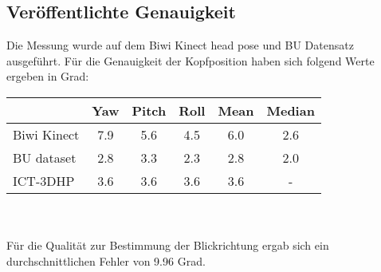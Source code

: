 \subsection{Veröffentlichte Genauigkeit}
Die Messung wurde auf dem Biwi Kinect head pose und BU Datensatz ausgeführt. Für die Genauigkeit der Kopfposition haben sich folgend Werte ergeben in Grad:\\
\begin{tabular}{|l|c|c|c||c|c|}
	\hline
	&Yaw&Pitch&Roll&Mean&Median\\\hline
	Biwi Kinect \cite{BIWI_database}&7.9&5.6&4.5&6.0&2.6\\\hline
	BU dataset \cite{BU_database}&2.8&3.3&2.3&2.8&2.0\\\hline
	ICT-3DHP \cite{ICT_database} &3.6&3.6&3.6&3.6&-\\\hline
\end{tabular}\\\\
Für die Qualität zur Bestimmung der Blickrichtung ergab sich ein durchschnittlichen Fehler von 9.96 Grad.